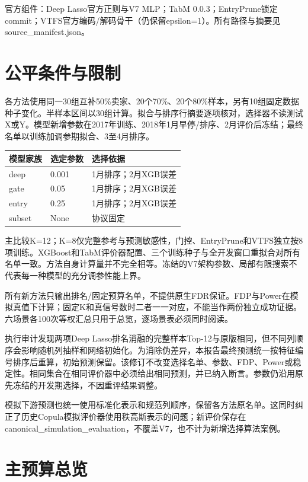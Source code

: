 \documentclass[UTF8,11pt,a4paper]{ctexart}
\begin{document}
官方组件：Deep Lasso官方正则与V7 MLP；TabM 0.0.3；EntryPrune锁定commit；VTFS官方编码/解码骨干（仍保留epsilon=1）。所有路径与摘要见source\_manifest.json。

\section{公平条件与限制}\label{ux516cux5e73ux6761ux4ef6ux4e0eux9650ux5236}

各方法使用同一30组互补50\%卖家、20个70\%、20个80\%样本，另有10组固定数据种子变化。半样本区间以30组计算。拟合与排序行摘要逐项核对，选择器不读测试X或Y。模型新增参数在2017年训练、2018年1月早停/排序、2月评价后冻结；最终名单以训练加调参期拟合、3至4月排序。

{\def\LTcaptype{none} %
{
\footnotesize
\begin{longtable}[]{@{}lll@{}}
\toprule\noalign{}
模型家族 & 选定参数 & 选择依据 \\
\midrule\noalign{}
\endhead
\bottomrule\noalign{}
\endlastfoot
deep & 0.001 & 1月排序；2月XGB误差 \\
gate & 0.05 & 1月排序；2月XGB误差 \\
entry & 0.25 & 1月排序；2月XGB误差 \\
subset & None & 协议固定 \\
\end{longtable}
}
}

主比较K=12；K=8仅完整参考与预测敏感性，门控、EntryPrune和VTFS独立按8项训练。XGBoost和TabM评价器配置、三个训练种子与全开发窗口重拟合对所有名单一致。方法自身计算量并不完全相等。冻结的V7架构参数、局部有限搜索不代表每一种模型的充分调参性能上界。

所有新方法只输出排名/固定预算名单，不提供原生FDR保证。FDP与Power在模拟真值下计算；固定K和真信号数时二者一一对应，不能当作两份独立成功证据。六场景各100次等权汇总只用于总览，逐场景表必须同时阅读。

执行审计发现两项Deep Lasso排名消融的完整样本Top-12与原版相同，但不同列顺序会影响随机列抽样和网络初始化。为消除伪差异，本报告最终预测统一按特征编号排序后重算，初始预测保留。该修订不改变选择名单、参数、FDP、Power或稳定性。相同集合在相同评价器中必须给出相同预测，并已纳入断言。参数仍沿用原先冻结的开发期选择，不因重评结果调整。

模拟下游预测也统一使用标准化表示和规范列顺序，保留各方法原名单。这同时纠正了历史Copula模拟评价器使用秩高斯表示的问题；新评价保存在canonical\_simulation\_evaluation，不覆盖V7，也不计为新增选择算法案例。

\section{主预算总览}\label{ux4e3bux9884ux7b97ux603bux89c8}
\end{document}
